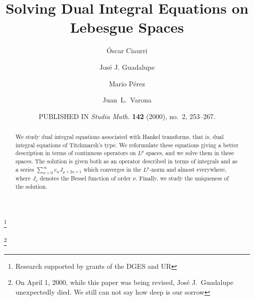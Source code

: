 \documentclass[12pt,leqno]{amsart}
\date{PUBLISHED IN \textit{Studia Math.}
\textbf{142} (2000), no.~2, 253--267.}
\theoremstyle{plain}
\begin{document}
\title[Solving Dual Integral Equations on Lebesgue Spaces]{Solving Dual
Integral Equations on Lebesgue Spaces}

\author[\'O. Ciaurri]{\'Oscar Ciaurri}
\address{Departamento de Matem\'aticas y Computaci\'on,
Universidad de La Rioja, Edificio J.~L.~Vives,
Calle Luis de Ulloa s/n, 26004 Logro\~no, Spain}

\author[J. J. Guadalupe]{Jos\'e J. Guadalupe}
\address{Departamento de Matem\'aticas y Computaci\'on,
Universidad de La Rioja, Edificio J.~L.~Vives,
Calle Luis de Ulloa s/n, 26004 Logro\~no, Spain}

\author[M. P\'erez]{Mario P\'erez}
\address{Departamento de Matem\'aticas,
Universidad de Zaragoza, Edificio de Matem\'aticas,
Ciudad Universitaria s/n, 50009 Zaragoza, Spain}

\author[J. L. Varona]{Juan~L.~Varona}
\address{Departamento de Matem\'aticas y Computaci\'on,
Universidad de La Rioja, Edificio J.~L.~Vives,
Calle Luis de Ulloa s/n, 26004 Logro\~no, Spain}
\thanks{Research supported by grants of the DGES and UR}

\thanks{On April 1, 2000, while this paper was being revised, Jos\'e
J.~Guadalupe unexpectedly died. We still can not say how deep is our sorrow}



\begin{abstract}
We study dual integral equations associated with Hankel transforms, that is,
dual integral equations of Titchmarsh's type.  We reformulate these equations
giving a better description in terms of continuous operators on $L^p$ spaces,
and we solve them in these spaces. The solution is given both as an operator
described in terms of integrals and as a series $\sum_{n=0}^\infty c_n
J_{\mu+2n+1}$ which converges in the $L^p$-norm and almost everywhere, where
$J_\nu$ denotes the Bessel function of order $\nu$. Finally, we study the
uniqueness of the solution.
\end{abstract}

\maketitle
\end{document}
